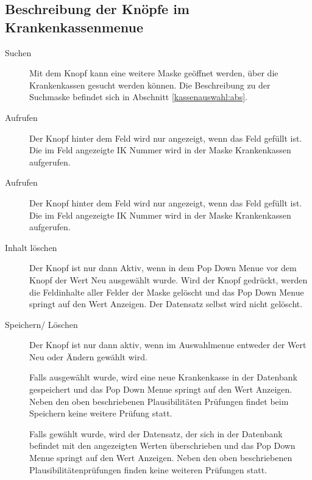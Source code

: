 \subsection{Beschreibung der Knöpfe im Krankenkassenmenue}
\begin{description}
\item[Suchen] 
Mit dem Knopf  kann eine weitere Maske geöffnet
werden, über die Krankenkassen gesucht werden können. Die Beschreibung zu der
Suchmaske befindet sich in Abschnitt \vref{kassenauswahl:abs}.
\item[Aufrufen] 
Der Knopf  hinter dem Feld
 wird nur angezeigt, wenn das Feld  gefüllt ist. 
Die im Feld  angezeigte IK Nummer wird in der Maske
Krankenkassen aufgerufen.
\item[Aufrufen] 
Der Knopf  hinter dem Feld
 wird nur angezeigt, 
wenn das Feld  gefüllt ist. 
Die im Feld  angezeigte IK Nummer wird in der Maske
Krankenkassen aufgerufen.
\item[Inhalt löschen] 
Der Knopf  ist nur dann
Aktiv, wenn in dem
Pop Down Menue vor dem Knopf der Wert Neu ausgewählt wurde. Wird der Knopf
gedrückt, werden die Feldinhalte aller Felder der Maske gelöscht und das
Pop Down Menue springt auf den Wert Anzeigen. Der Datensatz selbst wird
nicht gelöscht.
\item[Speichern/ Löschen] Der Knopf  ist nur dann aktiv,
wenn im
Auswahlmenue entweder der Wert Neu oder Ändern gewählt wird. 
\par
Falls 
ausgewählt wurde, wird eine neue Krankenkasse in der Datenbank gespeichert
und das Pop Down Menue springt auf den Wert Anzeigen. Neben den oben
beschriebenen Plausibilitäten Prüfungen findet beim Speichern keine weitere
Prüfung statt.\par
Falls  gewählt wurde, wird der Datensatz, der sich in der Datenbank
befindet mit den angezeigten Werten überschrieben und das Pop Down Menue
springt auf den Wert Anzeigen. Neben den oben beschriebenen
Plausibilitätenprüfungen finden keine weiteren Prüfungen statt.


\end{description}
